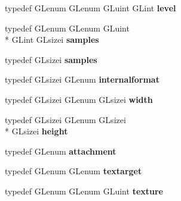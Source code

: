 \begin{DoxyCompactItemize}
\item 
\hypertarget{class_c_p_v_r_tgles2_ext_a49158fad242eb9651becfba298e2c243}{typedef G\+Lenum G\+Lenum G\+Luint G\+Lint {\bfseries level}}\label{class_c_p_v_r_tgles2_ext_a49158fad242eb9651becfba298e2c243}

\item 
\hypertarget{class_c_p_v_r_tgles2_ext_ab1c74d0d96ad8b7324938366e2355eda}{typedef G\+Lenum G\+Lenum G\+Luint \\*
G\+Lint G\+Lsizei {\bfseries samples}}\label{class_c_p_v_r_tgles2_ext_ab1c74d0d96ad8b7324938366e2355eda}

\item 
\hypertarget{class_c_p_v_r_tgles2_ext_a3fd19d50f4e2565a44928dc3926d007d}{typedef G\+Lsizei {\bfseries samples}}\label{class_c_p_v_r_tgles2_ext_a3fd19d50f4e2565a44928dc3926d007d}

\item 
\hypertarget{class_c_p_v_r_tgles2_ext_a4e2aa37edfa184ddce76ec91ac5d573d}{typedef G\+Lsizei G\+Lenum {\bfseries internalformat}}\label{class_c_p_v_r_tgles2_ext_a4e2aa37edfa184ddce76ec91ac5d573d}

\item 
\hypertarget{class_c_p_v_r_tgles2_ext_a31126d8711023adaa65f5fc9b111d7a4}{typedef G\+Lsizei G\+Lenum G\+Lsizei {\bfseries width}}\label{class_c_p_v_r_tgles2_ext_a31126d8711023adaa65f5fc9b111d7a4}

\item 
\hypertarget{class_c_p_v_r_tgles2_ext_a9c120cee81d2beff2554730b22a36745}{typedef G\+Lsizei G\+Lenum G\+Lsizei \\*
G\+Lsizei {\bfseries height}}\label{class_c_p_v_r_tgles2_ext_a9c120cee81d2beff2554730b22a36745}

\item 
\hypertarget{class_c_p_v_r_tgles2_ext_a40c9fa283601f2120198a057c1e9853a}{typedef G\+Lenum {\bfseries attachment}}\label{class_c_p_v_r_tgles2_ext_a40c9fa283601f2120198a057c1e9853a}

\item 
\hypertarget{class_c_p_v_r_tgles2_ext_af3712168a47282bd3e31f9d85fdc892b}{typedef G\+Lenum G\+Lenum {\bfseries textarget}}\label{class_c_p_v_r_tgles2_ext_af3712168a47282bd3e31f9d85fdc892b}

\item 
\hypertarget{class_c_p_v_r_tgles2_ext_a84aa8a62de530408b333c31d1344841b}{typedef G\+Lenum G\+Lenum G\+Luint {\bfseries texture}}\label{class_c_p_v_r_tgles2_ext_a84aa8a62de530408b333c31d1344841b}


\end{DoxyCompactItemize}
